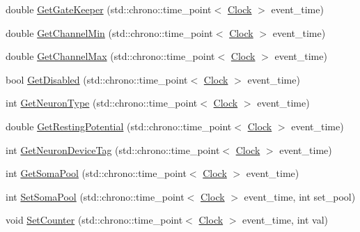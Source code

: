 \begin{DoxyCompactItemize}
\item 
double \hyperlink{class_neuron_a94accac3223afdecd1edf25e6db59ace}{Get\+Gate\+Keeper} (std\+::chrono\+::time\+\_\+point$<$ \hyperlink{universe_8h_a0ef8d951d1ca5ab3cfaf7ab4c7a6fd80}{Clock} $>$ event\+\_\+time)
\item 
double \hyperlink{class_neuron_a794c8fa270ea0600dab4fd13c25912fd}{Get\+Channel\+Min} (std\+::chrono\+::time\+\_\+point$<$ \hyperlink{universe_8h_a0ef8d951d1ca5ab3cfaf7ab4c7a6fd80}{Clock} $>$ event\+\_\+time)
\item 
double \hyperlink{class_neuron_ae8b6c47bebe302e62721dc4a6e447ca2}{Get\+Channel\+Max} (std\+::chrono\+::time\+\_\+point$<$ \hyperlink{universe_8h_a0ef8d951d1ca5ab3cfaf7ab4c7a6fd80}{Clock} $>$ event\+\_\+time)
\item 
bool \hyperlink{class_neuron_adfee1a62df820344b84fe2020451b24f}{Get\+Disabled} (std\+::chrono\+::time\+\_\+point$<$ \hyperlink{universe_8h_a0ef8d951d1ca5ab3cfaf7ab4c7a6fd80}{Clock} $>$ event\+\_\+time)
\item 
int \hyperlink{class_neuron_a98f326ea86e6e8371b639609a4495c37}{Get\+Neuron\+Type} (std\+::chrono\+::time\+\_\+point$<$ \hyperlink{universe_8h_a0ef8d951d1ca5ab3cfaf7ab4c7a6fd80}{Clock} $>$ event\+\_\+time)
\item 
double \hyperlink{class_neuron_a0573244d3c78a22a45c249db536cbb68}{Get\+Resting\+Potential} (std\+::chrono\+::time\+\_\+point$<$ \hyperlink{universe_8h_a0ef8d951d1ca5ab3cfaf7ab4c7a6fd80}{Clock} $>$ event\+\_\+time)
\item 
int \hyperlink{class_neuron_aff3a33f5d8ef5dacdec9c03df50f168c}{Get\+Neuron\+Device\+Tag} (std\+::chrono\+::time\+\_\+point$<$ \hyperlink{universe_8h_a0ef8d951d1ca5ab3cfaf7ab4c7a6fd80}{Clock} $>$ event\+\_\+time)
\item 
int \hyperlink{class_neuron_aa6f1237ed89c48eb57610083edf43efa}{Get\+Soma\+Pool} (std\+::chrono\+::time\+\_\+point$<$ \hyperlink{universe_8h_a0ef8d951d1ca5ab3cfaf7ab4c7a6fd80}{Clock} $>$ event\+\_\+time)
\item 
int \hyperlink{class_neuron_a14bef0cc064213659b38c93b002e8956}{Set\+Soma\+Pool} (std\+::chrono\+::time\+\_\+point$<$ \hyperlink{universe_8h_a0ef8d951d1ca5ab3cfaf7ab4c7a6fd80}{Clock} $>$ event\+\_\+time, int set\+\_\+pool)
\item 
void \hyperlink{class_neuron_a92f942f6f0bd783c39bb550cf4bb8fd0}{Set\+Counter} (std\+::chrono\+::time\+\_\+point$<$ \hyperlink{universe_8h_a0ef8d951d1ca5ab3cfaf7ab4c7a6fd80}{Clock} $>$ event\+\_\+time, int val)
\item 

\end{DoxyCompactItemize}
